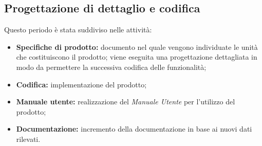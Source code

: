 \subsection{Progettazione di dettaglio e codifica}

\noindent Questo periodo è stata suddiviso nelle attività:
\begin{itemize}
	\item \textbf{Specifiche di prodotto:} documento nel quale vengono individuate le unità che costituiscono il prodotto; viene eseguita una progettazione dettagliata in modo da permettere la successiva codifica delle funzionalità;
	\item  \textbf{Codifica:} implementazione del prodotto;
	\item \textbf{Manuale utente:} realizzazione del \textit{Manuale Utente} per l'utilizzo del prodotto;
	\item \textbf{Documentazione:} incremento della documentazione in base ai nuovi dati rilevati.
\end{itemize}

